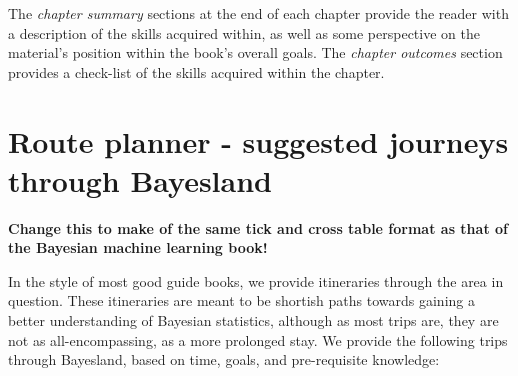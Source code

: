 \documentclass[11pt,fullpage]{book}
\begin{document}
The \textit{chapter summary} sections at the end of each chapter provide the reader with a description of the skills acquired within, as well as some perspective on the material's position within the book's overall goals. The \textit{chapter outcomes} section provides a check-list of the skills acquired within the chapter. 

\section{Route planner - suggested journeys through Bayesland}
\textbf{Change this to make of the same tick and cross table format as that of the Bayesian machine learning book!}

In the style of most good guide books, we provide itineraries through the area in question. These itineraries are meant to be shortish paths towards gaining a better understanding of Bayesian statistics, although as most trips are, they are not as all-encompassing, as a more prolonged stay. We provide the following trips through Bayesland, based on time, goals, and pre-requisite knowledge:
\end{document}
